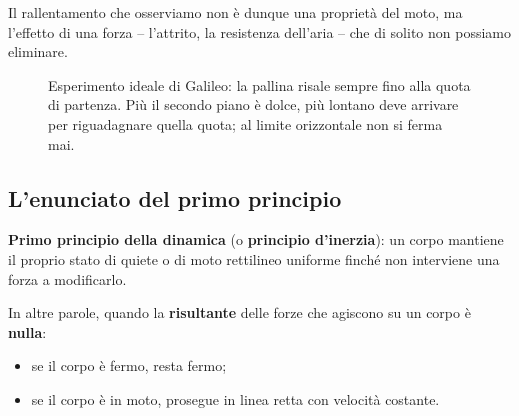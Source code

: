 Il rallentamento che osserviamo non è dunque una proprietà del moto, ma l'effetto di una forza -- l'attrito, la resistenza dell'aria -- che di solito non possiamo eliminare.

\begin{figure}[!htbp]
    \centering
    \caption{Esperimento ideale di Galileo: la pallina risale sempre fino alla quota di partenza. Più il secondo piano è dolce, più lontano deve arrivare per riguadagnare quella quota; al limite orizzontale non si ferma mai.}
    \label{fig:galileo-rampe}
\end{figure}

\subsection{L'enunciato del primo principio}

\begin{definizione}
\textbf{Primo principio della dinamica} (o \textbf{principio d'inerzia}): un corpo mantiene il proprio stato di quiete o di moto rettilineo uniforme finché non interviene una forza a modificarlo.
\end{definizione}

In altre parole, quando la \textbf{risultante} delle forze che agiscono su un corpo è \textbf{nulla}:
\begin{itemize}
    \item se il corpo è fermo, resta fermo;
    \item se il corpo è in moto, prosegue in linea retta con velocità costante.
\end{itemize}

